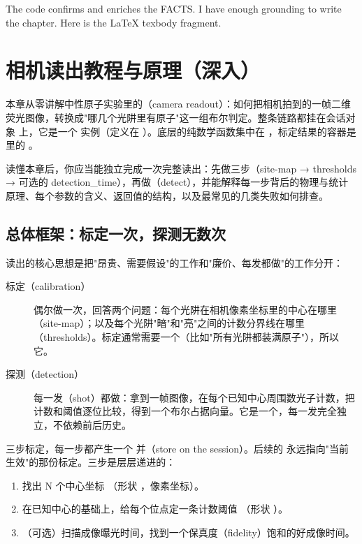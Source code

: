 \documentclass[11pt,oneside,openany]{book}
\begin{document}
The code confirms and enriches the FACTS. I have enough grounding to write the chapter. Here is the LaTeX texbody fragment.

\chapter{相机读出教程与原理（深入）}

本章从零讲解中性原子实验里的（camera readout）：如何把相机拍到的一帧二维荧光图像，转换成"哪几个光阱里有原子"这一组布尔判定。整条链路都挂在会话对象  上，它是一个  实例（定义在 ）。底层的纯数学函数集中在 ，标定结果的容器是  里的 。

读懂本章后，你应当能独立完成一次完整读出：先做三步（site-map → thresholds → 可选的 detection\_time），再做（detect），并能解释每一步背后的物理与统计原理、每个参数的含义、返回值的结构，以及最常见的几类失败如何排查。

\section{总体框架：标定一次，探测无数次}

读出的核心思想是把"昂贵、需要假设"的工作和"廉价、每发都做"的工作分开：

\begin{description}
\item[标定（calibration）] 偶尔做一次，回答两个问题：每个光阱在相机像素坐标里的中心在哪里（site-map）；以及每个光阱"暗"和"亮"之间的计数分界线在哪里（thresholds）。标定通常需要一个（比如"所有光阱都装满原子"），所以它。
\item[探测（detection）] 每一发（shot）都做：拿到一帧图像，在每个已知中心周围数光子计数，把计数和阈值逐位比较，得到一个布尔占据向量。它是一个，每一发完全独立，不依赖前后历史。
\end{description}

三步标定，每一步都产生一个  并（store on the session）。后续的  永远指向"当前生效"的那份标定。三步是层层递进的：

\begin{enumerate}
\item {} 找出 N 个中心坐标 （形状 ，像素坐标）。
\item {} 在已知中心的基础上，给每个位点定一条计数阈值 （形状 ）。
\item {}（可选）扫描成像曝光时间，找到一个保真度（fidelity）饱和的好成像时间。
\end{enumerate}
\end{document}
